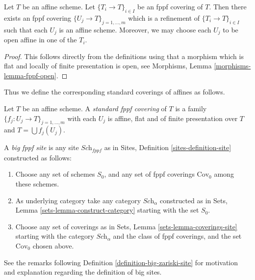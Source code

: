 \begin{lemma}
\label{lemma-fppf-affine}
Let $T$ be an affine scheme.
Let $\{T_i \to T\}_{i \in I}$ be an fppf covering of $T$.
Then there exists an fppf covering
$\{U_j \to T\}_{j = 1, \ldots, m}$ which is a refinement
of $\{T_i \to T\}_{i \in I}$ such that each $U_j$ is an affine
scheme. Moreover, we may choose each $U_j$ to be open affine
in one of the $T_i$.
\end{lemma}

\begin{proof}
This follows directly from the definitions using that a
morphism which is flat and locally of finite presentation is open,
see Morphisms, Lemma \ref{morphisms-lemma-fppf-open}.
\end{proof}

\noindent
Thus we define the corresponding standard coverings of affines as follows.

\begin{definition}
\label{definition-standard-fppf}
Let $T$ be an affine scheme. A {\it standard fppf covering}
of $T$ is a family $\{f_j : U_j \to T\}_{j = 1, \ldots, m}$
with each $U_j$ is affine, flat and of finite presentation over $T$
and $T = \bigcup f_j(U_j)$.
\end{definition}

\begin{definition}
\label{definition-big-fppf-site}
A {\it big fppf site} is any site $\textit{Sch}_{fppf}$ as in
Sites, Definition \ref{sites-definition-site} constructed as follows:
\begin{enumerate}
\item Choose any set of schemes $S_0$, and any set of fppf coverings
$\text{Cov}_0$ among these schemes.
\item As underlying category take any category $\textit{Sch}_\alpha$
constructed as in Sets, Lemma \ref{sets-lemma-construct-category}
starting with the set $S_0$.
\item Choose any set of coverings as in
Sets, Lemma \ref{sets-lemma-coverings-site} starting with the
category $\textit{Sch}_\alpha$ and the class of fppf coverings,
and the set $\text{Cov}_0$ chosen above.
\end{enumerate}
\end{definition}

\noindent
See the remarks following Definition \ref{definition-big-zariski-site}
for motivation and explanation regarding the definition of big sites.

